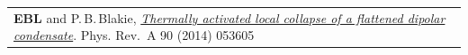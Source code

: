 \documentclass[10pt,a4paper,final]{article}
\begin{document}
\begin{tabularx}{\textwidth}{
   X}
   \footnotesize \textbf{EBL} and P.\,B.\,Blakie, \href{https://journals.aps.org/pra/pdf/10.1103/PhysRevA.90.053605}{\textit{Thermally activated local collapse of a flattened dipolar condensate}}. Phys. Rev.~A 90 (2014) 053605                                                                                                                                                                                                                                                                                                                                                                                                                                                                                                                                                   \\ %
\end{tabularx}
\end{document}

